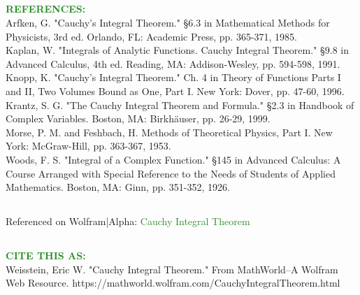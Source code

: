 \documentclass[11pt]{article}
\begin{document}
 \subsection*{}
 \textcolor{ForestGreen}{\textbf{REFERENCES:}}\\
Arfken, G. "Cauchy's Integral Theorem." §6.3 in Mathematical Methods for Physicists, 3rd ed. Orlando, FL: Academic Press, pp. 365-371, 1985.\\
Kaplan, W. "Integrals of Analytic Functions. Cauchy Integral Theorem." §9.8 in Advanced Calculus, 4th ed. Reading, MA: Addison-Wesley, pp. 594-598, 1991.\\
Knopp, K. "Cauchy's Integral Theorem." Ch. 4 in Theory of Functions Parts I and II, Two Volumes Bound as One, Part I. New York: Dover, pp. 47-60, 1996.\\
Krantz, S. G. "The Cauchy Integral Theorem and Formula." §2.3 in Handbook of Complex Variables. Boston, MA: Birkhäuser, pp. 26-29, 1999.\\
Morse, P. M. and Feshbach, H. Methods of Theoretical Physics, Part I. New York: McGraw-Hill, pp. 363-367, 1953.\\
Woods, F. S. "Integral of a Complex Function." §145 in Advanced Calculus: A Course Arranged with Special Reference to the Needs of Students of Applied Mathematics. Boston, MA: Ginn, pp. 351-352, 1926. \\
 \subsection*{}
 Referenced on Wolfram|Alpha: \textcolor{ForestGreen}{Cauchy Integral Theorem}
  \subsection*{}
 \textcolor{ForestGreen}{\textbf{ CITE THIS AS:}}\\
Weisstein, Eric W. "Cauchy Integral Theorem." From MathWorld--A Wolfram Web Resource. https://mathworld.wolfram.com/CauchyIntegralTheorem.html 
\end{document}
